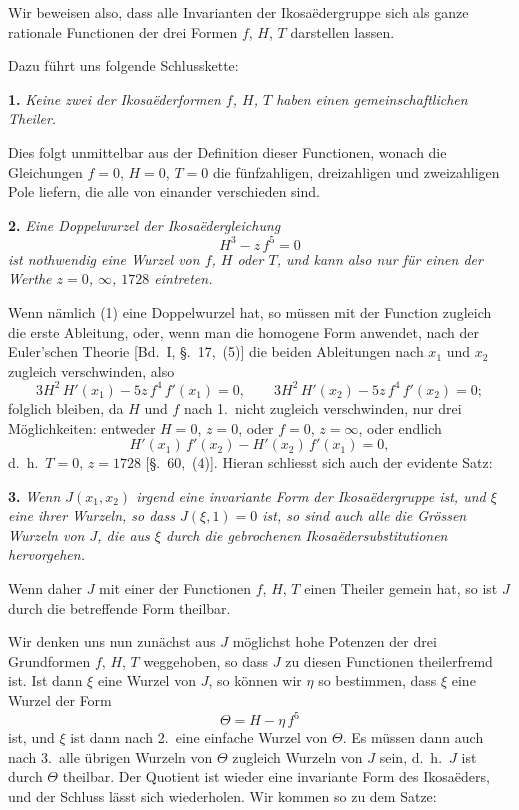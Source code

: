 \documentclass[12pt,a4paper]{article}
\theoremstyle{plain}
\theoremstyle{definition}
\theoremstyle{remark}
\begin{document}
Wir beweisen also, dass alle Invarianten der Ikosa\"edergruppe sich als ganze rationale Functionen der drei Formen $f$, $H$, $T$ darstellen lassen.

Dazu f\"uhrt uns folgende Schlusskette:

\medskip\noindent\textbf{1.} \emph{Keine zwei der Ikosa\"ederformen $f$, $H$, $T$ haben einen gemeinschaftlichen Theiler.}

\smallskip
Dies folgt unmittelbar aus der Definition dieser Functionen, wonach die Gleichungen $f = 0$, $H = 0$, $T = 0$ die f\"unfzahligen, dreizahligen und zweizahligen Pole liefern, die alle von einander verschieden sind.

\medskip\noindent\textbf{2.} \emph{Eine Doppelwurzel der Ikosa\"edergleichung}
\begin{equation}\tag{1}
H^{3} - z\,f^{5} = 0
\end{equation}
\emph{ist nothwendig eine Wurzel von $f$, $H$ oder $T$, und kann also nur f\"ur einen der Werthe $z = 0$, $\infty$, $1728$ eintreten.}

\smallskip
Wenn n\"amlich (1) eine Doppelwurzel hat, so m\"ussen mit der Function zugleich die erste Ableitung, oder, wenn man die homogene Form anwendet, nach der Euler'schen Theorie [Bd.~I, \S.~17,~(5)] die beiden Ableitungen nach $x_{1}$ und $x_{2}$ zugleich verschwinden, also
\[
3H^{2}\,H'(x_{1}) - 5z\,f^{4}\,f'(x_{1}) = 0,\qquad
3H^{2}\,H'(x_{2}) - 5z\,f^{4}\,f'(x_{2}) = 0;
\]
folglich bleiben, da $H$ und $f$ nach 1.\ nicht zugleich verschwinden, nur drei M\"oglichkeiten: entweder $H = 0$, $z = 0$, oder $f = 0$, $z = \infty$, oder endlich
\[
H'(x_{1})\,f'(x_{2}) - H'(x_{2})\,f'(x_{1}) = 0,
\]
d.~h.\ $T = 0$, $z = 1728$ [\S.~60,~(4)]. Hieran schliesst sich auch der evidente Satz:

\medskip\noindent\textbf{3.} \emph{Wenn $J(x_{1}, x_{2})$ irgend eine invariante Form der Ikosa\"edergruppe ist, und $\xi$ eine ihrer Wurzeln, so dass $J(\xi, 1) = 0$ ist, so sind auch alle die Gr\"ossen Wurzeln von $J$, die aus $\xi$ durch die gebrochenen Ikosa\"edersubstitutionen hervorgehen.}

\smallskip
Wenn daher $J$ mit einer der Functionen $f$, $H$, $T$ einen Theiler gemein hat, so ist $J$ durch die betreffende Form theilbar.

Wir denken uns nun zun\"achst aus $J$ m\"oglichst hohe Potenzen der drei Grundformen $f$, $H$, $T$ weggehoben, so dass $J$ zu diesen Functionen theilerfremd ist. Ist dann $\xi$ eine Wurzel von $J$, so k\"onnen wir $\eta$ so bestimmen, dass $\xi$ eine Wurzel der Form
\[
\Theta = H - \eta\,f^{5}
\]
ist, und $\xi$ ist dann nach 2.\ eine einfache Wurzel von $\Theta$. Es m\"ussen dann auch nach 3.\ alle \"ubrigen Wurzeln von $\Theta$ zugleich Wurzeln von $J$ sein, d.~h.\ $J$ ist durch $\Theta$ theilbar. Der Quotient ist wieder eine invariante Form des Ikosa\"eders, und der Schluss l\"asst sich wiederholen. Wir kommen so zu dem Satze:
\end{document}
